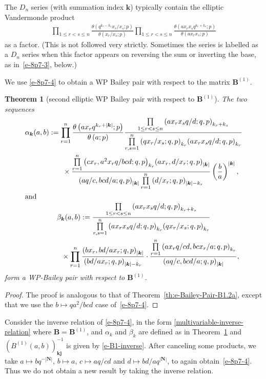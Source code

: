 \documentclass[pdftex]{sigma}
\numberwithin{equation}{section}
\newtheorem{Theorem}{Theorem}[section]
\newenvironment{Remark*}{\begin{remark*}\normalfont}{\end{remark*}}
\newcommand{\sumN}{{\left| \boldsymbol{N} \right|}}
\newcommand\sumk{{\left| \boldsymbol{k} \right|}}
\newcommand{\B}{{ \mathbf B}}
\renewcommand{\k}{{ \boldsymbol{k}}}
\renewcommand{\j}{{ \boldsymbol{j}}}
\newcommand{\triprod}[1]{\prod\limits_{1\le r < s \le #1}}
\newcommand{\sqprod}[1]{\prod\limits_{r, s =1}^{#1}} %
\newcommand{\smallprod}[1]{\prod\limits_{r =1}^{#1}} %
\newcommand{\xover}[1]{#1_{r}/#1_{s}}
\newcommand{\ellipticqrfac}[2]{{\left({#1}; q, p\right)_{#2}}} %
\newcommand{\elliptictheta}[1]{\theta \left({#1} ; p\right) }
\newcommand{\ellipticvandermonde}[3]{\triprod{#3} %
\!\! \frac{\elliptictheta{q^{#2_r-#2_s} \xover {#1} }}{\elliptictheta{\xover{#1}}}
}
\begin{document}
\begin{Remark*} The $D_n$ series (with summation index $\k$) typically contain the elliptic Vandermonde product
\begin{gather*}
\ellipticvandermonde{x}{k}{n} \triprod n \frac{\elliptictheta{ ax_rx_sq^{k_r+k_s}} }{\elliptictheta{ax_rx_s}}
\end{gather*}
as a factor. (This is not followed very strictly. Sometimes the series is labelled as a $D_n$ series when this factor appears on reversing the sum or inverting the base, as in~\eqref{e-8p7-3}, below.)
\end{Remark*}

We use \eqref{e-8p7-4} to obtain a WP Bailey pair with respect to the matrix $\B^{(1)}$.
\begin{Theorem}[second elliptic WP Bailey pair with respect to $\B^{(1)}$]\label{th:e-Bailey-Pair-B1.3b} The two sequences
\begin{gather*}
\alpha_\k(a,b) :=\smallprod n \frac{\elliptictheta{ax_rq^{k_r+\sumk}}}{\elliptictheta{a}}
\frac{\triprod n \ellipticqrfac{ax_rx_sq/d}{k_r+k_s}}{\sqprod n
\ellipticqrfac{q\xover x}{k_r}\ellipticqrfac{ax_rx_sq/d}{k_r}}\notag\\
\hphantom{\alpha_\k(a,b) :=}{} \times
 \frac{\smallprod n \ellipticqrfac{cx_r, a^2x_rq/bcd}{k_r}
 \ellipticqrfac{ax_r, d/x_r }{\sumk} }
{\ellipticqrfac{aq/c, bcd/a}{\sumk} \smallprod n \ellipticqrfac{d/x_r}{\sumk-k_r} }
 \left( \frac{b}{a}\right)^{\sumk} ,\\
\intertext{and}
\beta_\k(a,b) :=\frac{\triprod n \ellipticqrfac{ax_rx_sq/d}{k_r+k_s} }
 {\sqprod n \ellipticqrfac{ax_rx_sq/d}{k_r} \ellipticqrfac{q\xover x}{k_r}
 }\\
 \hphantom{\beta_\k(a,b) :=}{} \times
\smallprod n \frac{\ellipticqrfac{bx_r,bd/ax_r}{\sumk}} {\ellipticqrfac{bd/ax_r}{\sumk-k_r}} \cdot
\frac{ \smallprod n {\ellipticqrfac{ax_rq/cd, bcx_r/a}{k_r}} }{\ellipticqrfac{aq/c, bcd/a}{\sumk}},%
\end{gather*}
form a WP-Bailey pair with respect to $\B^{(1)}$.
\end{Theorem}
\begin{proof}The proof is analogous to that of Theorem~\ref{th:e-Bailey-Pair-B1.2a}, except that we use the $b\mapsto qa^2/bcd$ case of~\eqref{e-8p7-4}.
\end{proof}

Consider the inverse relation of \eqref{e-8p7-4}, in the form \eqref{multivariable-inverse-relation} where $\B=\B^{(1)}$, and $\alpha_k$ and $\beta_k$ are defined as in Theorem~\ref{th:e-Bailey-Pair-B1.3b} and $(B^{(1)}(a,b))^{-1}_{\k\j} $ is given by \eqref{e-B1-inverse}. After canceling some products, we take $a\mapsto bq^{-\sumN}$, $b\mapsto a$, $c\mapsto aq/cd$ and $d\mapsto bd/aq^{\sumN}$, to again obtain~\eqref{e-8p7-4}. Thus we do not obtain a new result by taking the inverse relation.
\end{document}
